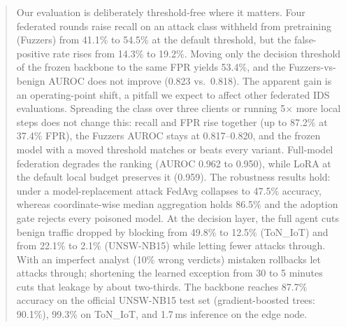 \begin{abstract}
Our evaluation is deliberately threshold-free where it matters. Four
federated rounds raise recall on an attack class withheld from pretraining
(Fuzzers) from 41.1\% to 54.5\% at the default threshold, but the
false-positive rate rises from 14.3\% to 19.2\%. Moving only the decision
threshold of the frozen backbone to the same FPR yields 53.4\%, and the
Fuzzers-vs-benign AUROC does not improve (0.823 vs.\ 0.818). The apparent
gain is an operating-point shift, a pitfall we expect to affect other
federated IDS evaluations. Spreading the class over three clients or running
5$\times$ more local steps does not change this: recall and FPR rise together
(up to 87.2\% at 37.4\% FPR), the Fuzzers AUROC stays at 0.817--0.820, and the
frozen model with a moved threshold matches or beats every variant.
Full-model federation degrades the ranking (AUROC 0.962 to 0.950), while LoRA
at the default local budget preserves it (0.959). The robustness
results hold: under a model-replacement attack FedAvg collapses to 47.5\%
accuracy, whereas coordinate-wise median aggregation holds 86.5\% and the
adoption gate rejects every poisoned model. At the decision layer, the full
agent cuts benign traffic dropped by blocking from 49.8\% to 12.5\% (ToN\_IoT)
and from 22.1\% to 2.1\% (UNSW-NB15) while letting fewer attacks through. With
an imperfect analyst (10\% wrong verdicts) mistaken rollbacks let attacks
through; shortening the learned exception from 30 to 5 minutes cuts that
leakage by about two-thirds. The backbone reaches 87.7\% accuracy on the official
UNSW-NB15 test set (gradient-boosted trees: 90.1\%), 99.3\% on ToN\_IoT, and
1.7\,ms inference on the edge node.
\end{abstract}

